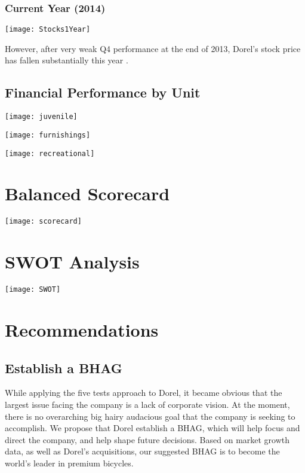 {\subsection{Current Year (2014)}
\centerline{\texttt{[image: Stocks1Year]}}
However, after very weak Q4 performance at the end of 2013, Dorel's stock price has fallen substantially this year \cite{YahooFinance2014}.

\pagebreak
\section {Financial Performance by Unit}
\centerline{\texttt{[image: juvenile]}}
\centerline{\texttt{[image: furnishings]}}
\centerline{\texttt{[image: recreational]}}

\chapter{Balanced Scorecard}
\label{chp:scorecard}
\centerline{\texttt{[image: scorecard]}}

\chapter{SWOT Analysis}
\label{chp:swot}
\centerline{\texttt{[image: SWOT]}}

\chapter{Recommendations}
\label{chp:recommendations}
\section{Establish a BHAG}
While applying the five tests approach to Dorel, it became obvious that the largest issue facing the company is a lack of corporate vision.  At the moment, there is no overarching big hairy audacious goal that the company is seeking to accomplish.  We propose that Dorel establish a BHAG, which will help focus and direct the company, and help shape future decisions.  Based on market growth data, as well as Dorel's acquisitions, our suggested BHAG is to become the world's leader in premium bicycles.  

}
